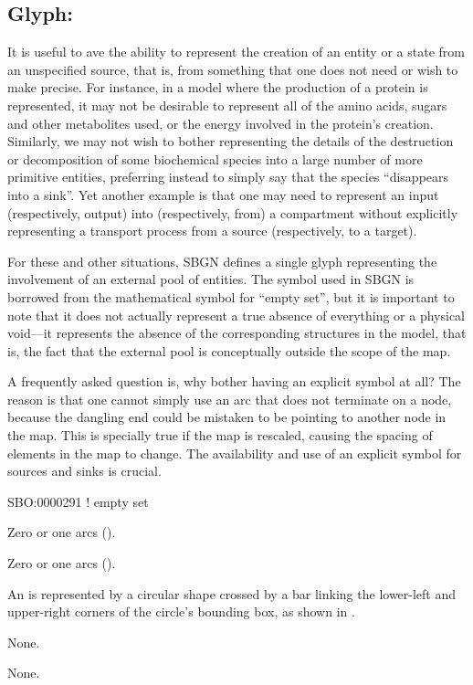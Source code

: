 \subsection{Glyph: }
\label{sec:emptySet}

It is useful to ave the ability to represent the creation of an entity or a state from an unspecified source, that is, from something that one does not need or wish to make precise.  For instance, in a model where the production of a protein is represented, it may not be desirable to represent all of the amino acids, sugars and other metabolites used, or the energy involved in the protein's creation.
Similarly, we may not wish to bother representing the details of the destruction or decomposition of some biochemical species into a large number of more primitive entities, preferring instead to simply say that the species ``disappears into a sink''.
Yet another example is that one may need to represent an input (respectively, output) into (respectively, from) a compartment without explicitly representing a transport process from a source (respectively, to a target).

For these and other situations, SBGN defines a single glyph representing the involvement of an external pool of entities.
The symbol used in SBGN is borrowed from the mathematical symbol for ``empty set'', but it is important to note that it does not actually represent a true absence of everything or a physical void---it represents the absence of the corresponding structures in the model, that is, the fact that the external pool is conceptually outside the scope of the map.

A frequently asked question is, why bother having an explicit symbol at all?
The reason is that one cannot simply use an arc that does not terminate on a node, because the dangling end could be mistaken to be pointing to another node in the map.  This is specially true if the map is rescaled, causing the spacing of elements in the map to change.
The availability and use of an explicit symbol for sources and sinks is crucial.

\begin{glyphDescription}

\glyphSboTerm
SBO:0000291 ! empty set


\glyphIncoming
Zero or one  arcs ().



\glyphOutgoing
Zero or one  arcs ().


\glyphContainer
An  is represented by a circular shape crossed by a bar linking the lower-left and upper-right corners of the circle's bounding box, as shown in .

\glyphLabel
None.

\glyphAux
None.

\end{glyphDescription}

